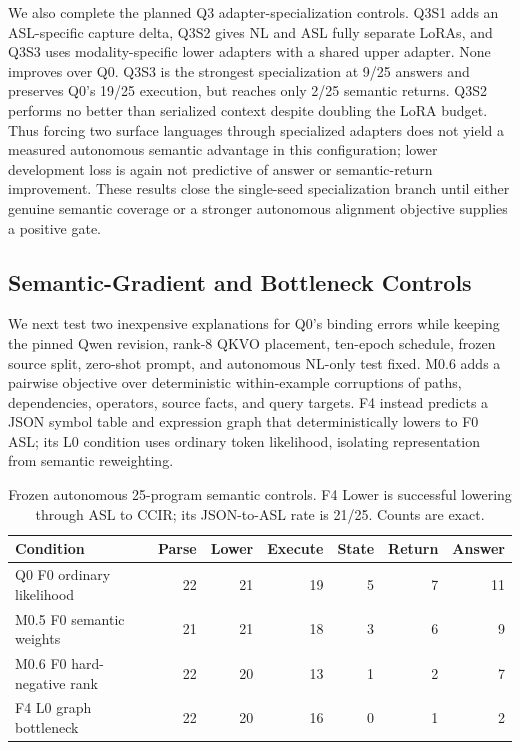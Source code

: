 \documentclass[11pt]{article}
\begin{document}
We also complete the planned Q3 adapter-specialization controls. Q3S1 adds an
ASL-specific capture delta, Q3S2 gives NL and ASL fully separate LoRAs, and Q3S3
uses modality-specific lower adapters with a shared upper adapter. None improves
over Q0. Q3S3 is the strongest specialization at 9/25 answers and preserves
Q0's 19/25 execution, but reaches only 2/25 semantic returns. Q3S2 performs no
better than serialized context despite doubling the LoRA budget. Thus forcing
two surface languages through specialized adapters does not yield a measured
autonomous semantic advantage in this configuration; lower development loss is
again not predictive of answer or semantic-return improvement. These results
close the single-seed specialization branch until either genuine semantic
coverage or a stronger autonomous alignment objective supplies a positive gate.

\subsection{Semantic-Gradient and Bottleneck Controls}

We next test two inexpensive explanations for Q0's binding errors while keeping
the pinned Qwen revision, rank-8 QKVO placement, ten-epoch schedule, frozen
source split, zero-shot prompt, and autonomous NL-only test fixed. M0.6 adds a
pairwise objective over deterministic within-example corruptions of paths,
dependencies, operators, source facts, and query targets. F4 instead predicts a
JSON symbol table and expression graph that deterministically lowers to F0 ASL;
its L0 condition uses ordinary token likelihood, isolating representation from
semantic reweighting.

\begin{table}[t]
\centering\small
\caption{Frozen autonomous 25-program semantic controls. F4 Lower is successful
lowering through ASL to CCIR; its JSON-to-ASL rate is 21/25. Counts are exact.}
\label{tab:asl-semantic-controls}
\begin{tabular}{lrrrrrr}
\toprule
Condition & Parse & Lower & Execute & State & Return & Answer\\
\midrule
Q0 F0 ordinary likelihood & 22 & 21 & 19 & 5 & 7 & 11\\
M0.5 F0 semantic weights & 21 & 21 & 18 & 3 & 6 & 9\\
M0.6 F0 hard-negative rank & 22 & 20 & 13 & 1 & 2 & 7\\
F4 L0 graph bottleneck    & 22 & 20 & 16 & 0 & 1 & 2\\
\bottomrule
\end{tabular}
\end{table}
\end{document}

